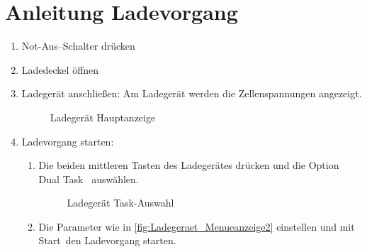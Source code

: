 \clearpage
\section{Anleitung Ladevorgang\label{sec:Anleitung_Laden}}
\begin{enumerate}
    \item Not-Aus--Schalter drücken
    \item Ladedeckel öffnen
    \item Ladegerät anschließen: Am Ladegerät werden die Zellenspannungen angezeigt.
    \begin{figure}[H]
        \centering
        \caption{Ladegerät Hauptanzeige \label{fig:Ladegeraet_Hauptanzeige}}
    \end{figure}
    \newpage
    \item Ladevorgang starten:
    \begin{enumerate}
        \item Die beiden mittleren Tasten des Ladegerätes drücken und die Option \glqq Dual Task \grqq\ auswählen.
        \begin{figure}[H]
            \centering
            \caption{Ladegerät Task-Auswahl \label{fig:Ladegeraet_Menueanzeige}}
        \end{figure}
        \item Die Parameter wie in \autoref{fig:Ladegeraet_Menueanzeige2} einstellen und mit \glqq Start\grqq\ den Ladevorgang starten.
        \begin{figure}[H]

\end{figure}
\end{enumerate}
\end{enumerate}
